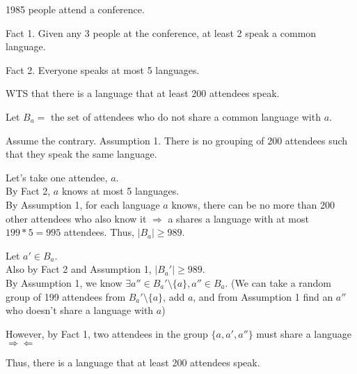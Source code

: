 \documentclass[fleqn]{article}
\begin{document}
1985 people attend a conference.

Fact 1. Given any 3 people at the conference, 
at least 2 speak a common language.

Fact 2. Everyone speaks at most 5 languages.

WTS that there is a language that at least 200 attendees speak.

Let $B_a = $ the set of attendees who do not share a common language with $a$.

Assume the contrary. 
Assumption 1. There is no grouping of 200 attendees such that they speak the same language.

Let's take one attendee, $a$.\\
By Fact 2, $a$ knows at most 5 languages.\\
By Assumption 1, for each language $a$ knows, there can be no more than 200 other attendees who also know it $\Rightarrow$ a shares a language with at most $199*5=995$ attendees. Thus, $|B_a| \geq 989$.

Let $a' \in B_a$.\\
Also by Fact 2 and Assumption 1, $|B_a'| \geq 989$.\\
By Assumption 1, we know 
$\exists a'' \in B_a' \setminus \lbrace a \rbrace, a'' \in B_a$.
(We can take a random group of 199 attendees from $B_a' \setminus \lbrace a \rbrace$, add $a$, and from Assumption 1 find an $a''$ who doesn't share a language with $a$)

However, by Fact 1, two attendees in the group 
$\lbrace a, a', a'' \rbrace$ must share a language 
$\Rightarrow \Leftarrow$

Thus, there is a language that at least 200 attendees speak.
\end{document}
